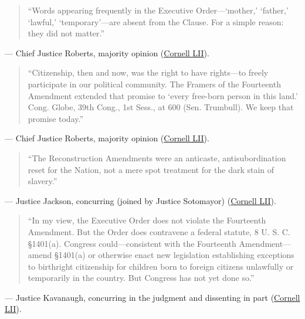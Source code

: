 \documentclass[12pt]{article}
\begin{document}
\begin{quote}
``Words appearing frequently in the Executive Order---`mother,' `father,' `lawful,' `temporary'---are absent from the Clause. For a simple reason: they did not matter.''
\end{quote}
\noindent --- Chief Justice Roberts, majority opinion (\href{https://www.law.cornell.edu/supremecourt/text/25-365}{Cornell LII}).

\begin{quote}
``Citizenship, then and now, was the right to have rights---to freely participate in our political community. The Framers of the Fourteenth Amendment extended that promise to `every free-born person in this land.' Cong. Globe, 39th Cong., 1st Sess., at 600 (Sen. Trumbull). We keep that promise today.''
\end{quote}
\noindent --- Chief Justice Roberts, majority opinion (\href{https://www.law.cornell.edu/supremecourt/text/25-365}{Cornell LII}).

\begin{quote}
``The Reconstruction Amendments were an anticaste, antisubordination reset for the Nation, not a mere spot treatment for the dark stain of slavery.''
\end{quote}
\noindent --- Justice Jackson, concurring (joined by Justice Sotomayor) (\href{https://www.law.cornell.edu/supremecourt/text/25-365}{Cornell LII}).

\begin{quote}
``In my view, the Executive Order does not violate the Fourteenth Amendment. But the Order does contravene a federal statute, 8 U. S. C. \S 1401(a). Congress could---consistent with the Fourteenth Amendment---amend \S 1401(a) or otherwise enact new legislation establishing exceptions to birthright citizenship for children born to foreign citizens unlawfully or temporarily in the country. But Congress has not yet done so.''
\end{quote}
\noindent --- Justice Kavanaugh, concurring in the judgment and dissenting in part (\href{https://www.law.cornell.edu/supremecourt/text/25-365}{Cornell LII}).
\end{document}
